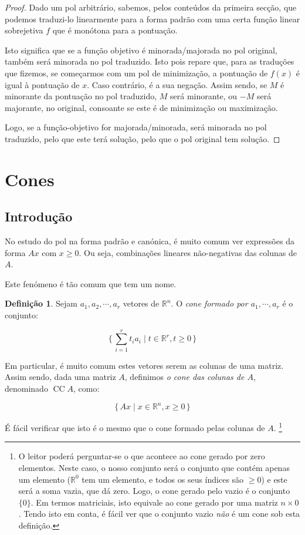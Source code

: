 \documentclass{article}
\DeclareMathOperator{\CC}{CC}
\newcommand{\R}{\mathbb{R}}
\theoremstyle{definition}
\newtheorem{definition}{Definição}
\begin{document}
	\begin{proof}
	Dado um pol arbitrário, sabemos, pelos conteúdos da primeira secção, que podemos traduzi-lo linearmente para a forma padrão com uma certa função linear sobrejetiva $f$ que é monótona para a pontuação.
	
	Isto significa que se a função objetivo é minorada/majorada no pol original, também será minorada no pol traduzido. Isto pois repare que, para as traduções que fizemos, se começarmos com um pol de minimização, a pontuação de $f(x)$ é igual à pontuação de $x$. Caso contrário, é a sua negação. Assim sendo, se $M$ é minorante da pontuação no pol traduzido, $M$ será minorante, ou $-M$ será majorante, no original, consoante se este é de minimização ou maximização.
	
	Logo, se a função-objetivo for majorada/minorada, será minorada no pol traduzido, pelo que este terá solução, pelo que o pol original tem solução.
	\end{proof}
	
	\section{Cones}
	
	\subsection{Introdução}
	
	No estudo do pol na forma padrão e canónica, é muito comum ver expressões da forma $Ax$ com $x \geq 0$. Ou seja, combinações lineares não-negativas das colunas de $A$.
	
	Este fenómeno é tão comum que tem um nome.
	
	\begin{definition}
	Sejam $a_1, a_2, \cdots, a_r$ vetores de $\R^n$. O \emph{cone formado por $a_1, \cdots, a_r$} é o conjunto:
	
	\[\{\, \sum_{i=1}^r t_i a_i \mid t \in \R^r, t \geq 0\,\}\]
	
	Em particular, é muito comum estes vetores serem as colunas de uma matriz. Assim sendo, dada uma matriz $A$, definimos \emph{o cone das colunas de $A$}, denominado $\CC A$, como:
	
	\[\{\, Ax \mid x \in \R^n, x \geq 0\,\}\]
	
	É fácil verificar que isto é o mesmo que o cone formado pelas colunas de $A$. \footnote{O leitor poderá perguntar-se o que acontece ao cone gerado por zero elementos. Neste caso, o nosso conjunto será o conjunto que contém apenas um elemento ($\R^0$ tem um elemento, e todos os seus índices são $\geq 0$) e este será a soma vazia, que dá zero. Logo, o cone gerado pelo vazio é o conjunto $\{0\}$. Em termos matriciais, isto equivale ao cone gerado por uma matriz $n \times 0$. Tendo isto em conta, é fácil ver que o conjunto vazio \emph{não} é um cone sob esta definição.}
	\end{definition}
	
\end{document}
